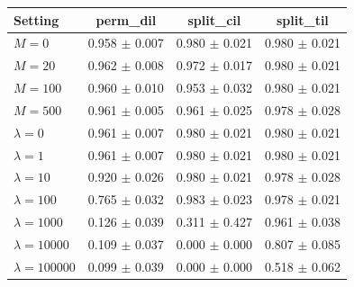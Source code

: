 \begin{tabular}{lccc}
\toprule
Setting & perm\_dil & split\_cil & split\_til \\
\midrule
$M=0$ & 0.958 $\pm$ 0.007 & 0.980 $\pm$ 0.021 & 0.980 $\pm$ 0.021 \\
$M=20$ & 0.962 $\pm$ 0.008 & 0.972 $\pm$ 0.017 & 0.980 $\pm$ 0.021 \\
$M=100$ & 0.960 $\pm$ 0.010 & 0.953 $\pm$ 0.032 & 0.980 $\pm$ 0.021 \\
$M=500$ & 0.961 $\pm$ 0.005 & 0.961 $\pm$ 0.025 & 0.978 $\pm$ 0.028 \\
\midrule
$\lambda=0$ & 0.961 $\pm$ 0.007 & 0.980 $\pm$ 0.021 & 0.980 $\pm$ 0.021 \\
$\lambda=1$ & 0.961 $\pm$ 0.007 & 0.980 $\pm$ 0.021 & 0.980 $\pm$ 0.021 \\
$\lambda=10$ & 0.920 $\pm$ 0.026 & 0.980 $\pm$ 0.021 & 0.978 $\pm$ 0.028 \\
$\lambda=100$ & 0.765 $\pm$ 0.032 & 0.983 $\pm$ 0.023 & 0.978 $\pm$ 0.021 \\
$\lambda=1000$ & 0.126 $\pm$ 0.039 & 0.311 $\pm$ 0.427 & 0.961 $\pm$ 0.038 \\
$\lambda=10000$ & 0.109 $\pm$ 0.037 & 0.000 $\pm$ 0.000 & 0.807 $\pm$ 0.085 \\
$\lambda=100000$ & 0.099 $\pm$ 0.039 & 0.000 $\pm$ 0.000 & 0.518 $\pm$ 0.062 \\
\bottomrule
\end{tabular}
